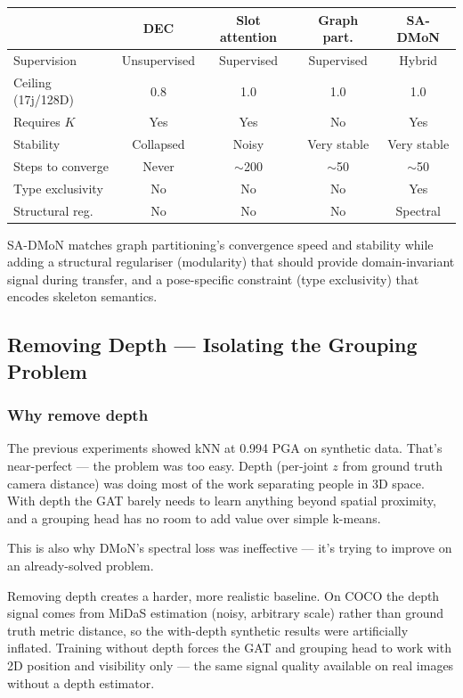 \begin{center}
\small
\begin{tabular}{lcccc}
\toprule
 & DEC & Slot attention & Graph part. & SA-DMoN \\
\midrule
Supervision & Unsupervised & Supervised & Supervised & Hybrid \\
Ceiling (17j/128D) & 0.8 & 1.0 & 1.0 & 1.0 \\
Requires $K$ & Yes & Yes & No & Yes \\
Stability & Collapsed & Noisy & Very stable & Very stable \\
Steps to converge & Never & $\sim$200 & $\sim$50 & $\sim$50 \\
Type exclusivity & No & No & No & Yes \\
Structural reg. & No & No & No & Spectral \\
\bottomrule
\end{tabular}
\end{center}

SA-DMoN matches graph partitioning's convergence speed and stability while adding a structural regulariser (modularity) that should provide domain-invariant signal during transfer, and a pose-specific constraint (type exclusivity) that encodes skeleton semantics.


\subsection{Removing Depth --- Isolating the Grouping Problem}

\subsubsection{Why remove depth}

The previous experiments showed kNN at 0.994 PGA on synthetic data. That's near-perfect --- the problem was too easy. Depth (per-joint $z$ from ground truth camera distance) was doing most of the work separating people in 3D space. With depth the GAT barely needs to learn anything beyond spatial proximity, and a grouping head has no room to add value over simple k-means.

This is also why DMoN's spectral loss was ineffective --- it's trying to improve on an already-solved problem.

Removing depth creates a harder, more realistic baseline. On COCO the depth signal comes from MiDaS estimation (noisy, arbitrary scale) rather than ground truth metric distance, so the with-depth synthetic results were artificially inflated. Training without depth forces the GAT and grouping head to work with 2D position and visibility only --- the same signal quality available on real images without a depth estimator.

